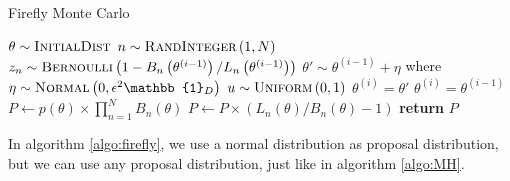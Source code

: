 \documentclass{article}
\theoremstyle{definition}
\begin{document}
\begin{algorithm}[H]
    \caption{Firefly Monte Carlo}
    \label{algo:firefly}
    \begin{algorithmic}[1] %
        \State $\theta \sim \textsc{InitialDist}$ 
        \State $n\sim \textsc{RandInteger}\left(1, N\right)$
        \State $z_n \sim \textsc{Bernoulli}\left(1 - B_n\left(\theta^{\left(i - 1\right)}\right)/L_n\left(\theta^{\left(i-1\right)}\right)\right) $
        \EndFor
        \State$\theta' \sim \theta^{\left(i-1\right)} + \eta$ where $\eta\sim \textsc{Normal}\left(0, \epsilon^2 \mathbb{1}_D\right)$
        \State $u\sim \textsc{Uniform}\left(0,1\right)$
        \State $\theta^{\left(i\right)} = \theta'$
        \Else 
        \State $\theta^{\left(i\right)} = \theta^{\left(i-1\right)}$
         \EndIf
         \EndFor
         \\
            \State $P \gets p\left(\theta\right)\times \prod_{n=1}^N B_n\left(\theta\right)$
                \State $P\gets P \times \left(L_n\left(\theta\right)/B_n\left(\theta\right) - 1\right)$
                \EndFor
           \State \textbf{return} $P$
        \EndFunction
    \end{algorithmic}
\end{algorithm}
In algorithm \ref{algo:firefly}, we use a normal distribution as proposal distribution, but we can use any proposal distribution, just like in algorithm \ref{algo:MH}. 
\end{document}
